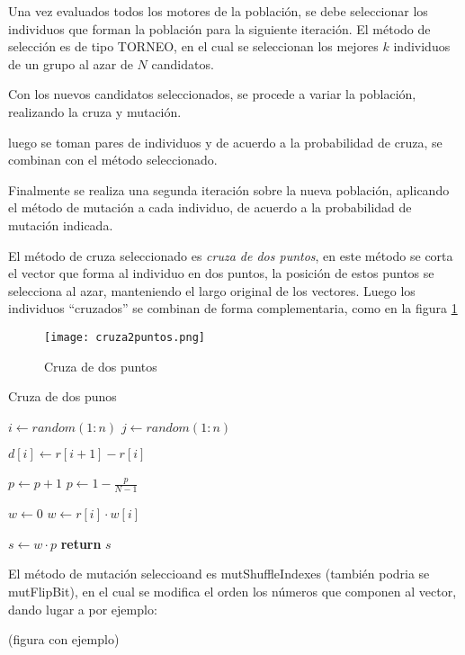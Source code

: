 Una vez evaluados todos los motores de la población, se debe seleccionar los
individuos que forman la población para la siguiente iteración.
%
El método de selección es de tipo TORNEO, en el cual se seleccionan los mejores
$k$ individuos de un grupo al azar de $N$ candidatos.
%

Con los nuevos candidatos seleccionados, se procede a variar la población,
realizando la cruza y mutación.

luego se toman pares de individuos y de acuerdo a la probabilidad de cruza, se
combinan con el método seleccionado.

Finalmente se realiza una segunda iteración sobre la nueva población, aplicando
el método de mutación a cada individuo, de acuerdo a la probabilidad de mutación
indicada.


El método de cruza seleccionado es \emph{cruza de dos puntos}, en este método se
corta el vector que forma al individuo en dos puntos, la posición de estos
puntos se selecciona al azar, manteniendo el largo original de los vectores.
%
Luego los individuos ``cruzados'' se combinan de forma complementaria, como en
la figura \ref{fig:cr2puntos}

\begin{figure}
  \centering
  \texttt{[image: cruza2puntos.png]}
  \caption{Cruza de dos puntos}
  \label{fig:cr2puntos}
\end{figure}

\begin{algorithm}
\caption{Cruza de dos punos}\label{alg:c2puntos}
\begin{algorithmic}[1]

  \State $i\gets random(1:n)$
  \State $j\gets random(1:n)$

    \State $d[i]\gets r[i+1]-r[i]$
  \EndFor

      \State $p\gets p + 1$
    \EndIf
  \EndFor
  \State $p \gets 1 - \frac{p}{N-1}$

  \State $w \gets 0$
    \State $w \gets r[i] \cdot w[i]$
  \EndFor

  \State $s \gets w \cdot p$
  \State \textbf{return} $s$
\EndProcedure
\end{algorithmic}
\end{algorithm}

El método de mutación seleccioand es mutShuffleIndexes (también podria se
mutFlipBit), en el cual se modifica el orden los números que componen al vector,
dando lugar a por ejemplo:

(figura con ejemplo)
